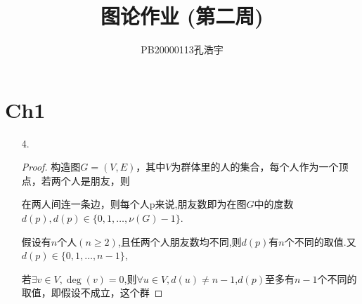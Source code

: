 \documentclass{article}
\title{图论作业 (第二周)}
\author{PB20000113孔浩宇}
\begin{document}
\maketitle
\section*{Ch1}
\begin{enumerate}
    \item [4.]\begin{proof}
        构造图$G=(V,E)$，其中$V$为群体里的人的集合，每个人作为一个顶点，若两个人是朋友，则
        
        在两人间连一条边，则每个人p来说,朋友数即为在图$G$中的度数$d(p), d(p)\in \{0,1,\dots,\nu (G)-1\}$.

        假设有$n$个人$(n\geq 2)$,且任两个人朋友数均不同,则$d(p)$有$n$个不同的取值.又$d (p)\in \{0,1,\dots,n-1\}$,
        
        若$\exists v\in V,\deg(v)=0$,则$\forall u\in V,d(u) \neq n-1$,$d(p)$至多有$n-1$个不同的取值，即假设不成立，这个群
        

\end{proof}
\end{enumerate}
\end{document}
